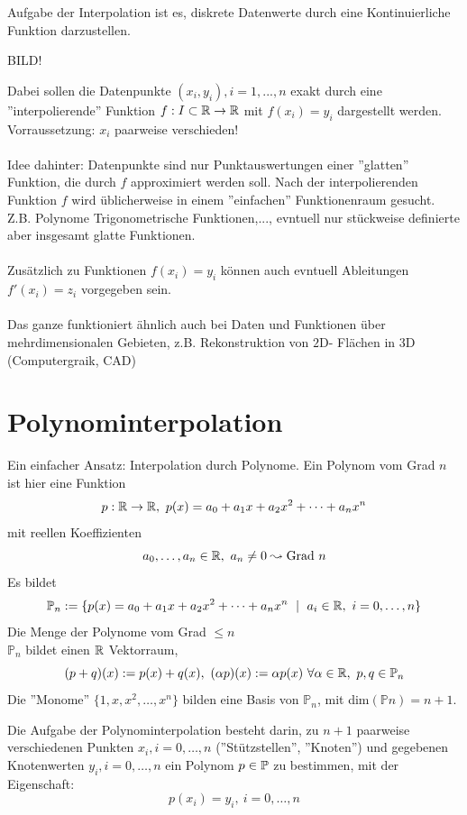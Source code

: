 Aufgabe der Interpolation ist es, diskrete Datenwerte durch eine Kontinuierliche Funktion darzustellen.
\begin{center}
    BILD!
\end{center}
Dabei sollen die Datenpunkte $(x_i,y_i), i=1,...,n$ exakt durch eine ''interpolierende'' Funktion $f:I\subset\mathbb{R} \to\mathbb{R}$ mit 
$f(x_i)=y_i$ dargestellt werden. Vorraussetzung: $x_i$ paarweise verschieden!\\\\
Idee dahinter: Datenpunkte sind nur Punktauswertungen einer ''glatten'' Funktion, die durch $f$ approximiert werden soll. 
Nach der interpolierenden Funktion $f$ wird üblicherweise in einem ''einfachen'' Funktionenraum gesucht. Z.B. Polynome 
Trigonometrische Funktionen,..., evntuell nur stückweise definierte aber insgesamt glatte Funktionen.\\\\
Zusätzlich zu Funktionen $f(x_i)=y_i$ können auch evntuell Ableitungen $f'(x_i)=z_i$ vorgegeben sein.\\\\
Das ganze funktioniert ähnlich auch bei Daten und Funktionen über mehrdimensionalen Gebieten, z.B. Rekonstruktion von $2$D-
Flächen in $3$D (Computergraik, CAD) 

\section{Polynominterpolation}
Ein einfacher Ansatz: Interpolation durch Polynome. 
Ein Polynom vom Grad $n$ ist hier eine Funktion\\
\[p:\mathbb{R} \to \mathbb{R} , \ p(x)= a_0+a_1x+a_2x^2+\dots+a_nx^n\] mit reellen Koeffizienten \[a_0,\dots,a_n\in\mathbb{R},\ a_n\neq 0 \leadsto 
\text{Grad } n\]
Es bildet
\[\mathbb{P}_n:=\{p(x)=a_0+a_1x+a_2x^2+\dots+a_nx^n \ \mid \ a_i\in\mathbb{R} ,\ i=0,\dots, n\}\] Die Menge der Polynome vom Grad 
$\leq n$\\
$\mathbb{P}_n$ bildet einen $\mathbb{R}$ Vektorraum, $$(p+q)(x):=p(x)+q(x), \ (\alpha p)(x):=\alpha p(x)\  \forall \alpha\in\R,\ 
p,q\in\bbP_n$$
Die ''Monome'' $\{1,x,x^2,\dots,x^n\}$ bilden eine Basis von $\mathbb{P}_n$, mit dim$(\mathbb{P}n)=n+1$.
\begin{definition}
    Die Aufgabe der Polynominterpolation besteht darin, zu $n+1$ paarweise verschiedenen Punkten $x_i, i=0,\dots, n$ 
    (''Stützstellen'', ''Knoten'') und gegebenen Knotenwerten $y_i, i=0, \dots, n$ ein Polynom $p\in\mathbb{P}$ zu bestimmen, mit 
    der Eigenschaft: \[p(x_i) = y_i, \ i=0,\dots,n\]
\end{definition}

